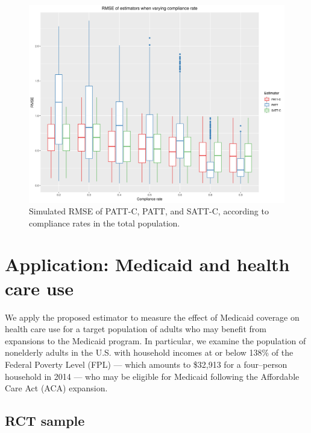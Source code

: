 \documentclass[hidelinks,12pt]{article}
\begin{document}
{%

\begin{figure}[htbp]
\begin{center}
\includegraphics[width = 1\textwidth]{rmse_boxplots_rateC}
\caption{Simulated RMSE of PATT-C, PATT, and SATT-C, according to compliance rates in the total population.\label{fig:rmse_boxplots_rateC}}
\end{center}
\end{figure}

\section{Application: Medicaid and health care use} \label{application}

We apply the proposed estimator to measure the effect of Medicaid coverage on health care use for a target population of adults who may benefit from expansions to the Medicaid program. In particular, we examine the population of nonelderly adults in the U.S. with household incomes at or below 138\% of the Federal Poverty Level (FPL) --- which amounts to \$32,913 for a four--person household in 2014 --- who may be eligible for Medicaid following the Affordable Care Act (ACA) expansion.

\subsection{RCT sample} 

}
\end{document}
